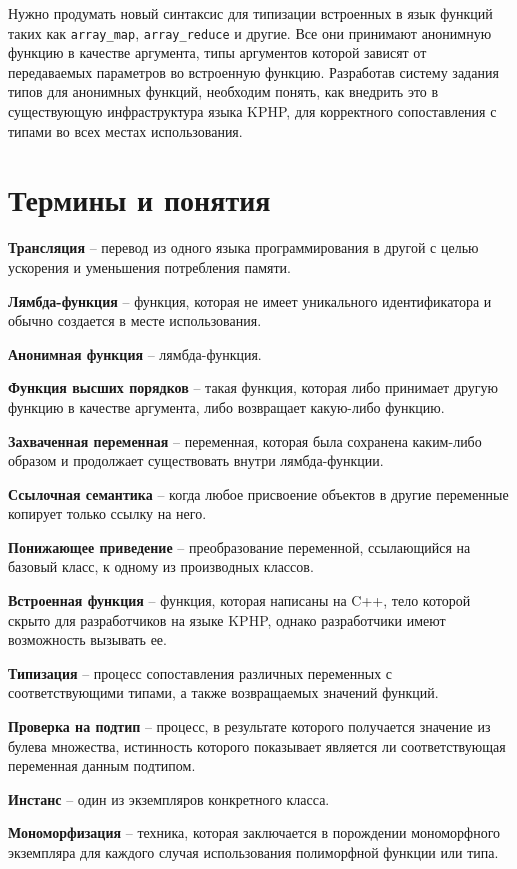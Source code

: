Нужно продумать новый синтаксис для типизации встроенных в язык функций таких как \verb|array_map|, \verb|array_reduce| и другие.
Все они принимают анонимную функцию в качестве аргумента, типы аргументов которой зависят от передаваемых параметров во встроенную функцию.
Разработав систему задания типов для анонимных функций, необходим понять, как внедрить это в существующую инфраструктура языка KPHP, для корректного сопоставления с типами во всех местах использования.

\section{Термины и понятия}
\textbf{Трансляция} -- перевод из одного языка программирования в другой с целью ускорения и уменьшения потребления памяти.

\textbf{Лямбда-функция} -- функция, которая не имеет уникального идентификатора и обычно создается в месте использования.

\textbf{Анонимная функция} -- лямбда-функция.

\textbf{Функция высших порядков} -- такая функция, которая либо принимает другую функцию в качестве аргумента, либо возвращает какую-либо функцию.

\textbf{Захваченная переменная} -- переменная, которая была сохранена каким-либо образом и продолжает существовать внутри лямбда-функции.

\textbf{Ссылочная семантика} -- когда любое присвоение объектов в другие переменные копирует только ссылку на него.

\textbf{Понижающее приведение} -- преобразование переменной, ссылающийся на базовый класс, к одному из производных классов.

\textbf{Встроенная функция} -- функция, которая написаны на C++, тело которой скрыто для разработчиков на языке KPHP, однако разработчики имеют возможность вызывать ее.

\textbf{Типизация} -- процесс сопоставления различных переменных с соответствующими типами, а также возвращаемых значений функций.

\textbf{Проверка на подтип} -- процесс, в результате которого получается значение из булева множества, истинность которого показывает является ли соответствующая переменная данным подтипом.

\textbf{Инстанс} -- один из экземпляров конкретного класса.

\textbf{Мономорфизация} -- техника, которая заключается в порождении мономорфного экземпляра для каждого случая использования полиморфной функции или типа.

